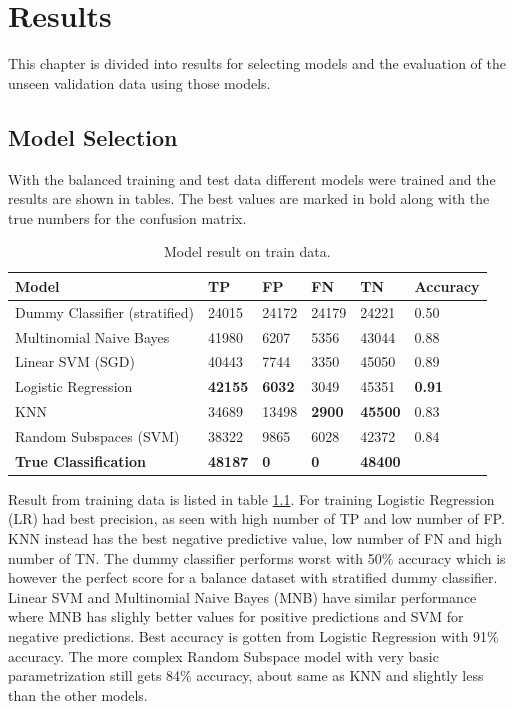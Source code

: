 \chapter{Results}
\label{cha:results}

This chapter is divided into results for selecting models and the evaluation of the unseen validation data using those models. 


\section{Model Selection}
\label{sec:model-selection-result}

With the balanced training and test data different models were trained and the results are shown in tables. 
The best values are marked in bold along with the true numbers for the confusion matrix. 


\begin{table}[H]
    \centering
    \caption{Model result on train data.}
    \label{tab:train-table}
    \begin{tabular}{@{}llllll@{}}
    \toprule
    Model                         & TP             & FP            & FN            & TN             & Accuracy      \\ \midrule
    Dummy Classifier (stratified) & 24015          & 24172         & 24179         & 24221          & 0.50          \\
    Multinomial Naive Bayes       & 41980          & 6207          & 5356          & 43044          & 0.88          \\
    Linear SVM (SGD)              & 40443          & 7744          & 3350          & 45050          & 0.89          \\
    Logistic Regression           & \textbf{42155} & \textbf{6032} & 3049          & 45351          & \textbf{0.91} \\
    KNN                           & 34689          & 13498         & \textbf{2900} & \textbf{45500} & 0.83          \\
    Random Subspaces (SVM)        & 38322          & 9865          & 6028          & 42372          & 0.84          \\ \midrule
    \textbf{True Classification}  & \textbf{48187} & \textbf{0}    & \textbf{0}    & \textbf{48400} & \textbf{}    
    \end{tabular}
\end{table}


Result from training data is listed in table \ref{tab:train-table}. 
For training Logistic Regression (LR) had best precision, as seen with high number of TP and low number of FP. 
KNN instead has the best negative predictive value, low number of FN and high number of TN. 
The dummy classifier performs worst with 50\% accuracy which is however the perfect score for a balance dataset with stratified dummy classifier. 
Linear SVM and Multinomial Naive Bayes (MNB) have similar performance where MNB has slighly better values for positive predictions and SVM for negative predictions. 
Best accuracy is gotten from Logistic Regression with 91\% accuracy. 
The more complex Random Subspace model with very basic parametrization still gets 84\% accuracy, about same as KNN and slightly less than the other models.


